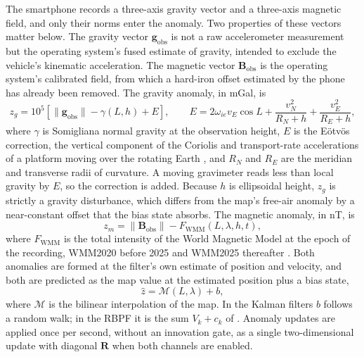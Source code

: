 The smartphone records a three-axis gravity vector and a three-axis magnetic field, and only their norms enter the anomaly. Two properties of these vectors matter below. The gravity vector \(\mathbf{g}_\text{obs}\) is not a raw accelerometer measurement but the operating system's fused estimate of gravity, intended to exclude the vehicle's kinematic acceleration. The magnetic vector \(\mathbf{B}_\text{obs}\) is the operating system's calibrated field, from which a hard-iron offset estimated by the phone has already been removed. The gravity anomaly, in mGal, is
\begin{equation}
  z_g = 10^{5}\left[\lVert\mathbf{g}_\text{obs}\rVert - \gamma(L, h) + E\right], \qquad
  E = 2\omega_{ie} v_E \cos L + \frac{v_N^2}{R_N + h} + \frac{v_E^2}{R_E + h},
  \label{eqn:gravity-anomaly-obs}
\end{equation}
where \(\gamma\) is Somigliana normal gravity at the observation height, \(E\) is the E\"{o}tv\"{o}s correction, the vertical component of the Coriolis and transport-rate accelerations of a platform moving over the rotating Earth \citep{groves_ch5}, and \(R_N\) and \(R_E\) are the meridian and transverse radii of curvature. A moving gravimeter reads less than local gravity by \(E\), so the correction is added. Because \(h\) is ellipsoidal height, \(z_g\) is strictly a gravity disturbance, which differs from the map's free-air anomaly by a near-constant offset that the bias state absorbs. The magnetic anomaly, in nT, is
\begin{equation}
  z_m = \lVert\mathbf{B}_\text{obs}\rVert - F_\text{WMM}(L, \lambda, h, t),
  \label{eqn:magnetic-anomaly-obs}
\end{equation}
where \(F_\text{WMM}\) is the total intensity of the World Magnetic Model at the epoch of the recording, WMM2020 before 2025 and WMM2025 thereafter \citep{wmm2020, wmm}. Both anomalies are formed at the filter's own estimate of position and velocity, and both are predicted as the map value at the estimated position plus a bias state,
\begin{equation}
  \hat{z} = \mathcal{M}(L, \lambda) + b,
  \label{eqn:anomaly-prediction}
\end{equation}
where \(\mathcal{M}\) is the bilinear interpolation of the map. In the Kalman filters \(b\) follows a random walk; in the RBPF it is the sum \(V_k + c_k\) of . Anomaly updates are applied once per second, without an innovation gate, as a single two-dimensional update with diagonal \(\mathbf{R}\) when both channels are enabled.

